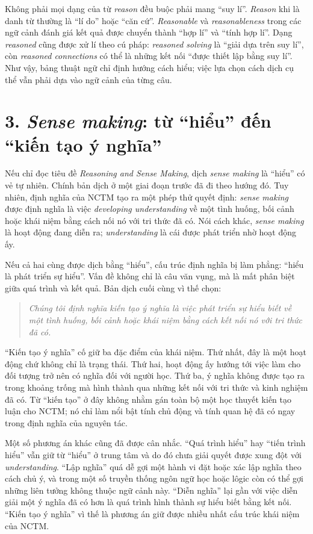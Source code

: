 Không phải mọi dạng của từ \emph{reason} đều buộc phải mang ``suy lí''. \emph{Reason} khi là danh từ thường là ``lí do'' hoặc ``căn cứ''. \emph{Reasonable} và \emph{reasonableness} trong các ngữ cảnh đánh giá kết quả được chuyển thành ``hợp lí'' và ``tính hợp lí''. Dạng \emph{reasoned} cũng được xử lí theo cú pháp: \emph{reasoned solving} là ``giải dựa trên suy lí'', còn \emph{reasoned connections} có thể là những kết nối ``được thiết lập bằng suy lí''. Như vậy, bảng thuật ngữ chỉ định hướng cách hiểu; việc lựa chọn cách dịch cụ thể vẫn phải dựa vào ngữ cảnh của từng câu.

\section*{3. \emph{Sense making}: từ ``hiểu'' đến ``kiến tạo ý nghĩa''}

Nếu chỉ đọc tiêu đề \emph{Reasoning and Sense Making}, dịch \emph{sense making} là ``hiểu'' có vẻ tự nhiên. Chính bản dịch ở một giai đoạn trước đã đi theo hướng đó. Tuy nhiên, định nghĩa của NCTM tạo ra một phép thử quyết định: \emph{sense making} được định nghĩa là việc \emph{developing understanding} về một tình huống, bối cảnh hoặc khái niệm bằng cách nối nó với tri thức đã có. Nói cách khác, \emph{sense making} là hoạt động đang diễn ra; \emph{understanding} là cái được phát triển nhờ hoạt động ấy.

Nếu cả hai cùng được dịch bằng ``hiểu'', cấu trúc định nghĩa bị làm phẳng: ``hiểu là phát triển sự hiểu''. Vấn đề không chỉ là câu văn vụng, mà là mất phân biệt giữa quá trình và kết quả. Bản dịch cuối cùng vì thế chọn:

\begin{quote}
\emph{Chúng tôi định nghĩa kiến tạo ý nghĩa là việc phát triển sự hiểu biết về một tình huống, bối cảnh hoặc khái niệm bằng cách kết nối nó với tri thức đã có.}
\end{quote}

``Kiến tạo ý nghĩa'' cố giữ ba đặc điểm của khái niệm. Thứ nhất, đây là một hoạt động chứ không chỉ là trạng thái. Thứ hai, hoạt động ấy hướng tới việc làm cho đối tượng trở nên có nghĩa đối với người học. Thứ ba, ý nghĩa không được tạo ra trong khoảng trống mà hình thành qua những kết nối với tri thức và kinh nghiệm đã có. Từ ``kiến tạo'' ở đây không nhằm gán toàn bộ một học thuyết kiến tạo luận cho NCTM; nó chỉ làm nổi bật tính chủ động và tính quan hệ đã có ngay trong định nghĩa của nguyên tác.

Một số phương án khác cũng đã được cân nhắc. ``Quá trình hiểu'' hay ``tiến trình hiểu'' vẫn giữ từ ``hiểu'' ở trung tâm và do đó chưa giải quyết được xung đột với \emph{understanding}. ``Lập nghĩa'' quá dễ gợi một hành vi đặt hoặc xác lập nghĩa theo cách chủ ý, và trong một số truyền thống ngôn ngữ học hoặc lôgic còn có thể gợi những liên tưởng không thuộc ngữ cảnh này. ``Diễn nghĩa'' lại gần với việc diễn giải một ý nghĩa đã có hơn là quá trình hình thành sự hiểu biết bằng kết nối. ``Kiến tạo ý nghĩa'' vì thế là phương án giữ được nhiều nhất cấu trúc khái niệm của NCTM.

